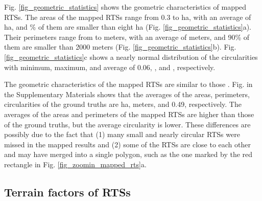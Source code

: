\documentclass[authoryear,preprint,review,12pt]{elsarticle}
\begin{document}
Fig. \ref{fig_geometric_statistics} shows the geometric characteristics of mapped RTSs.  The areas of the mapped RTSs range from 0.3 to  ha, with an average of  ha, and \% of them are smaller than eight ha (Fig. \ref{fig_geometric_statistics}a). Their perimeters range from  to  meters, with an average of  meters, and 90\% of them are smaller than 2000 meters  (Fig. \ref{fig_geometric_statistics}b). Fig. \ref{fig_geometric_statistics}c shows a nearly normal distribution of the circularities with minimum, maximum, and average of 0.06, , and , respectively. 

The geometric characteristics of the mapped RTSs are similar to those . Fig.  in the Supplementary Materials shows that the averages of the areas, perimeters, circularities of the ground truths 
 are  ha,  meters, and 0.49, respectively. The averages of the areas and perimeters of the mapped RTSs are higher than those of the ground truths, but the average circularity is lower. These differences are possibly due to the fact that (1) many small and nearly circular RTSs were missed in the mapped results and (2) some of the RTSs are close to each other and may have merged into a single polygon, such as the one marked by the red rectangle in Fig. \ref{fig_zoomin_mapped_rts}a.  

\subsection{Terrain factors of RTSs}
\label{subsec_terrain}
\end{document}
